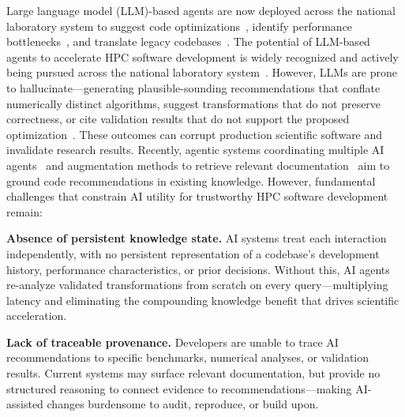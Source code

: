 \documentclass{files/proposalnsf}
\begin{document}
Large language model (LLM)-based agents are now deployed across the national laboratory system to suggest code optimizations~\cite{podduturi2025ai}, identify performance bottlenecks~\cite{polu2025ai}, and translate legacy codebases~\cite{claude,rummler2026sandians}. The potential of LLM-based agents to accelerate HPC software development is widely recognized and actively being pursued across the national laboratory system~\cite{rummler2026sandians}. However, LLMs are prone to hallucinate---generating plausible-sounding recommendations that conflate numerically distinct algorithms, suggest transformations that do not preserve correctness, or cite validation results that do not support the proposed optimization~\cite{Ji2023HallucinationSurvey}. These outcomes can corrupt production scientific software and invalidate research results. Recently, agentic systems coordinating multiple AI agents~\cite{ezzrhari2020scalable} and augmentation methods to retrieve relevant documentation~\cite{miyashita2024llm} aim to ground code recommendations in existing knowledge. However, fundamental challenges that constrain AI utility for trustworthy HPC software development remain:

\textbf{Absence of persistent knowledge state.} AI systems treat each interaction independently, with no persistent representation of a codebase's development history, performance characteristics, or prior decisions. Without this, AI agents re-analyze validated transformations from scratch on every query---multiplying latency and eliminating the compounding knowledge benefit that drives scientific acceleration. %

\textbf{Lack of traceable provenance.} Developers are unable to trace AI recommendations to specific benchmarks, numerical analyses, or validation results. Current systems may surface relevant documentation, but provide no structured reasoning to connect evidence to recommendations---making AI-assisted changes burdensome to audit, reproduce, or build upon. \vspace{-5pt}


\end{document}
